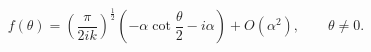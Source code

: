 \begin{equation}
f(\theta )=\left( \frac{\pi }{2ik}\right) ^{\frac{1}{2}}\left( -\alpha \cot
\frac{\theta}{2}-i\alpha \right) +O\left( \alpha ^{2}\right) ,
\qquad \theta \neq 0.
\label{eq7}
\end{equation}

